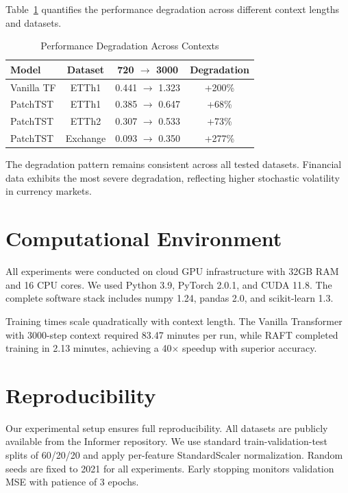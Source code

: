 \documentclass{article} %
\begin{document}
Table~\ref{tab:degradation} quantifies the performance degradation across different context lengths and datasets.

\begin{table}[h]
\centering
\caption{Performance Degradation Across Contexts}
\label{tab:degradation}
\small
\begin{tabular}{lccc}
\toprule
\textbf{Model} & \textbf{Dataset} & \textbf{720 $\rightarrow$ 3000} & \textbf{Degradation} \\
\midrule
Vanilla TF & ETTh1 & 0.441 $\rightarrow$ 1.323 & +200\% \\
PatchTST & ETTh1 & 0.385 $\rightarrow$ 0.647 & +68\% \\
PatchTST & ETTh2 & 0.307 $\rightarrow$ 0.533 & +73\% \\
PatchTST & Exchange & 0.093 $\rightarrow$ 0.350 & +277\% \\
\bottomrule
\end{tabular}
\end{table}

The degradation pattern remains consistent across all tested datasets. Financial data exhibits the most severe degradation, reflecting higher stochastic volatility in currency markets.

\section{Computational Environment}

All experiments were conducted on cloud GPU infrastructure with 32GB RAM and 16 CPU cores. We used Python 3.9, PyTorch 2.0.1, and CUDA 11.8. The complete software stack includes numpy 1.24, pandas 2.0, and scikit-learn 1.3.

Training times scale quadratically with context length. The Vanilla Transformer with 3000-step context required 83.47 minutes per run, while RAFT completed training in 2.13 minutes, achieving a 40$\times$ speedup with superior accuracy.

\section{Reproducibility}

Our experimental setup ensures full reproducibility. All datasets are publicly available from the Informer repository. We use standard train-validation-test splits of 60/20/20 and apply per-feature StandardScaler normalization. Random seeds are fixed to 2021 for all experiments. Early stopping monitors validation MSE with patience of 3 epochs.
\end{document}
